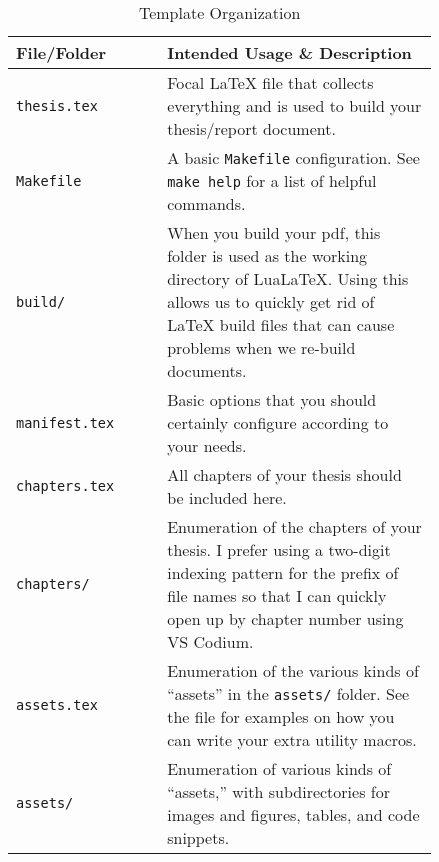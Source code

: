 \begin{longtable}[c]{|>{\raggedright}p{0.3\linewidth}|>{\raggedright\arraybackslash}p{0.54\linewidth}|}
    \caption{Template Organization}
    \label{tab:organization}                                                                   \\

    \hline

    \textbf{File/Folder}           & \textbf{Intended Usage \& Description}
    \\ \hline

    \texttt{thesis.tex}            & Focal \LaTeX{} file that collects everything and is
    used to build your thesis/report document.
    \\ \hline

    \texttt{Makefile}              & A basic \texttt{Makefile} configuration. See
    \texttt{make help} for a list of helpful commands.                                         \\ \hline

    \texttt{build/}                & When you build your \acs{pdf}, this folder is used as the
    working directory of LuaLaTeX. Using this allows us to quickly get rid of
    \LaTeX{} build files that can cause problems when we re-build documents.                   \\
    \hline

    \texttt{manifest.tex}          & Basic options that you should certainly configure
    according to your needs.
    \\ \hline

    \texttt{chapters.tex}          & All chapters of your thesis should be included here.
    \\ \hline

    \texttt{chapters/}             & Enumeration of the chapters of your thesis. I prefer
    using a two-digit indexing pattern for the prefix of file names so that I
    can quickly open up by chapter number using VS Codium.                                     \\ \hline

    \texttt{assets.tex}            & Enumeration of the various kinds of ``assets'' in the
    \texttt{assets/} folder. See the file for examples on how you can write your
    extra utility macros.                                                                      \\ \hline

    \texttt{assets/}               & Enumeration of various kinds of ``assets,'' with
    subdirectories for images and figures, tables, and code snippets.                          \\ \hline


\end{longtable}
